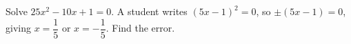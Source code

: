 Solve $25x^2-10x+1=0$. A student writes $(5x-1)^2=0$, so $\pm(5x-1)=0$, giving $x=\dfrac15$ or $x=-\dfrac15$. Find the error.
